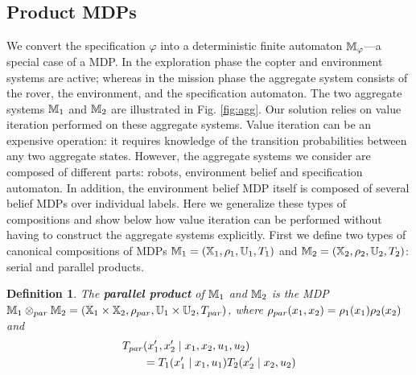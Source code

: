 \documentclass[conference]{IEEEtran}
\newtheorem{definition}{Definition}
\begin{document}
\subsection{Product MDPs}
\label{sub:products}

We convert the specification $\varphi$ into a deterministic finite automaton $\mathbb{M}_\varphi$---a special case of a MDP. In the exploration phase the copter and environment systems are active; whereas in the mission phase the aggregate system consists of the rover, the environment, and the specification automaton. The two aggregate systems $\mathbb{M}_1$ and $\mathbb{M}_2$ are illustrated in Fig. \ref{fig:agg}. Our solution relies on value iteration performed on these aggregate systems. Value iteration can be an expensive operation: it requires knowledge of the transition probabilities between any two aggregate states. However, the aggregate systems we consider are composed of different parts: robots, environment belief and specification automaton. In addition, the environment belief MDP itself is composed of several belief MDPs over individual labels. Here we generalize these types of compositions and show below how value iteration can be performed without having to construct the aggregate systems explicitly. First we define two types of canonical compositions of MDPs $\mathbb{M}_1 = (\mathbb{X}_1, \rho_1, \mathbb{U}_1, T_1)$ and $\mathbb{M}_2 = (\mathbb{X}_2, \rho_2, \mathbb{U}_2, T_2)$: serial and parallel products.
\begin{definition}
  The \textbf{parallel product} of $\mathbb{M}_1$ and $\mathbb{M}_2$ is the MDP $\mathbb{M}_1 \otimes_{par} \mathbb{M}_2 = (\mathbb{X}_1 \times \mathbb{X}_2, \rho_{par}, \mathbb{U}_1 \times \mathbb{U}_2, T_{par})$, where $\rho_{par}(x_1, x_2) = \rho_1(x_1) \rho_2(x_2)$
  and
  \begin{equation}
  \begin{aligned}
      T_{par}&(x_1', x_2' \mid x_1, x_2, u_1, u_2) \\
      & = T_1 (x_1' \mid x_1, u_1) T_2 (x_2' \mid x_2, u_2)
  \end{aligned}
  \end{equation}
\end{definition}
\end{document}

